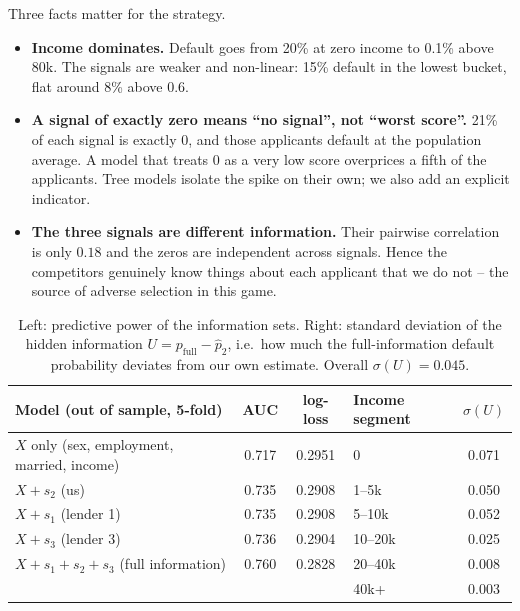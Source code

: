 \documentclass[11pt,a4paper]{article}
\begin{document}
Three facts matter for the strategy.
\begin{itemize}
  \item \textbf{Income dominates.} Default goes from 20\% at zero income to 0.1\% above 80k. The signals are
        weaker and non-linear: 15\% default in the lowest bucket, flat around 8\% above $0.6$.
  \item \textbf{A signal of exactly zero means ``no signal'', not ``worst score''.} 21\% of each signal is exactly
        0, and those applicants default at the population average. A model that treats 0 as a very low score
        overprices a fifth of the applicants. Tree models isolate the spike on their own; we also add an explicit
        indicator.
  \item \textbf{The three signals are different information.} Their pairwise correlation is only $0.18$ and the
        zeros are independent across signals. Hence the competitors genuinely know things about each applicant
        that we do not -- the source of adverse selection in this game.
\end{itemize}

\begin{table}[h]\centering\small
\begin{tabular}{lcc@{\hskip 1.2cm}lc}
\toprule
Model (out of sample, 5-fold) & AUC & log-loss & Income segment & $\sigma(U)$ \\
\midrule
$X$ only (sex, employment, married, income) & 0.717 & 0.2951 & 0       & 0.071\\
$X + s_2$ (us)                              & 0.735 & 0.2908 & 1--5k   & 0.050\\
$X + s_1$ (lender 1)                        & 0.735 & 0.2908 & 5--10k  & 0.052\\
$X + s_3$ (lender 3)                        & 0.736 & 0.2904 & 10--20k & 0.025\\
$X + s_1 + s_2 + s_3$ (full information)    & 0.760 & 0.2828 & 20--40k & 0.008\\
                                            &       &        & 40k+    & 0.003\\
\bottomrule
\end{tabular}
\caption{Left: predictive power of the information sets. Right: standard deviation of the hidden information
$U = p_{\text{full}} - \hat p_2$, i.e.\ how much the full-information default probability deviates from our own
estimate. Overall $\sigma(U) = 0.045$.}
\label{tab:models}
\end{table}
\end{document}
